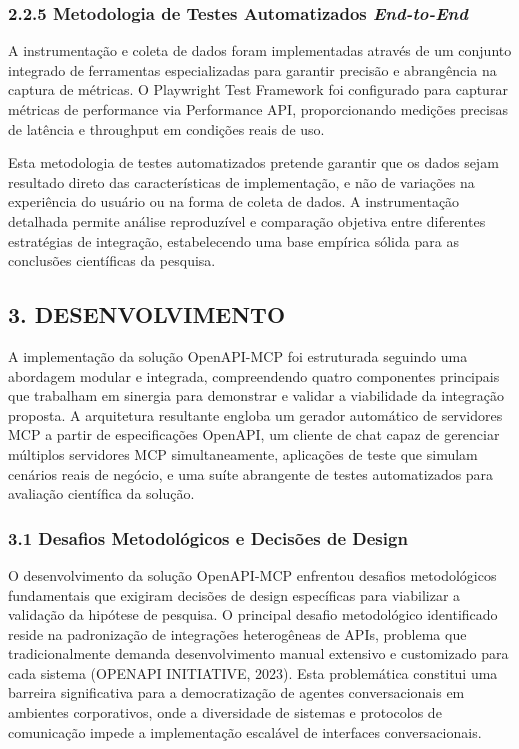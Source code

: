 \documentclass[
]{article}
\begin{document}
\subsubsection{\texorpdfstring{2.2.5 Metodologia de Testes Automatizados
\emph{End-to-End}}{2.2.5 Metodologia de Testes Automatizados End-to-End}}\label{metodologia-de-testes-automatizados-end-to-end}

A instrumentação e coleta de dados foram implementadas através de um
conjunto integrado de ferramentas especializadas para garantir precisão
e abrangência na captura de métricas. O Playwright Test Framework foi
configurado para capturar métricas de performance via Performance API,
proporcionando medições precisas de latência e throughput em condições
reais de uso.

Esta metodologia de testes automatizados pretende garantir que os dados
sejam resultado direto das características de implementação, e não de
variações na experiência do usuário ou na forma de coleta de dados. A
instrumentação detalhada permite análise reproduzível e comparação
objetiva entre diferentes estratégias de integração, estabelecendo uma
base empírica sólida para as conclusões científicas da pesquisa.

\subsection{3. DESENVOLVIMENTO}\label{desenvolvimento}

A implementação da solução OpenAPI-MCP foi estruturada seguindo uma
abordagem modular e integrada, compreendendo quatro componentes
principais que trabalham em sinergia para demonstrar e validar a
viabilidade da integração proposta. A arquitetura resultante engloba um
gerador automático de servidores MCP a partir de especificações OpenAPI,
um cliente de chat capaz de gerenciar múltiplos servidores MCP
simultaneamente, aplicações de teste que simulam cenários reais de
negócio, e uma suíte abrangente de testes automatizados para avaliação
científica da solução.

\subsubsection{3.1 Desafios Metodológicos e Decisões de
Design}\label{desafios-metodoluxf3gicos-e-decisuxf5es-de-design}

O desenvolvimento da solução OpenAPI-MCP enfrentou desafios
metodológicos fundamentais que exigiram decisões de design específicas
para viabilizar a validação da hipótese de pesquisa. O principal desafio
metodológico identificado reside na padronização de integrações
heterogêneas de APIs, problema que tradicionalmente demanda
desenvolvimento manual extensivo e customizado para cada sistema
(OPENAPI INITIATIVE, 2023). Esta problemática constitui uma barreira
significativa para a democratização de agentes conversacionais em
ambientes corporativos, onde a diversidade de sistemas e protocolos de
comunicação impede a implementação escalável de interfaces
conversacionais.
\end{document}
